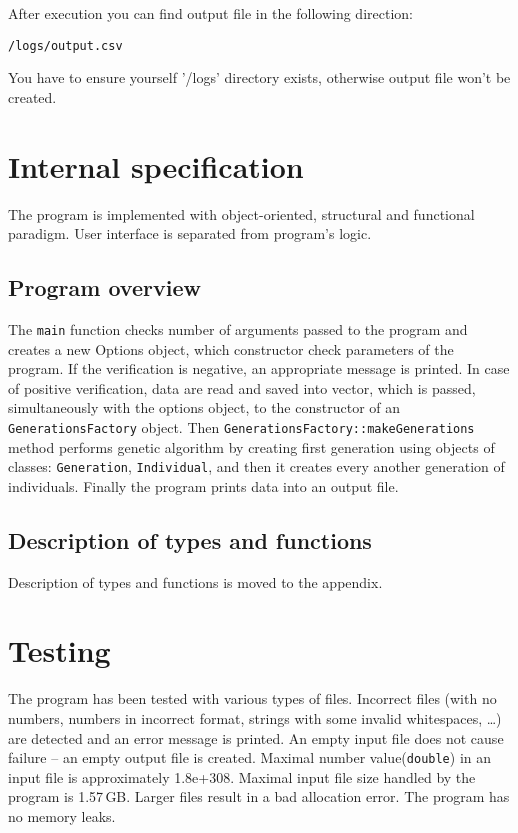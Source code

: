 \documentclass[12pt,a4paper,twoside]{article}
\let\oldmarginpar\marginpar
\renewcommand\marginpar[1]{%
  {\linespread{0.85}\normalfont\scriptsize%
\oldmarginpar[\hspace{1cm}\begin{minipage}{3cm}\raggedleft\scriptsize\color{black}\textsf{#1}\end{minipage}]%
{\hspace{0cm}\begin{minipage}{3cm}\raggedright\scriptsize\color{black}\textsf{#1}\end{minipage}}%
}%
}
\begin{document}
After execution you can find output file in the following direction:
\begin{verbatim}
/logs/output.csv
\end{verbatim}

You have to ensure yourself '/logs' directory exists, otherwise output file won't be created.


\section{Internal specification}\label{sec:internal}
The program is implemented with object-oriented, structural and functional paradigm. User interface is separated from program's logic.

 

\subsection{Program overview}
The \lstinline|main| function checks number of arguments passed to the program and creates a new Options object, which constructor check parameters of the program. If the verification is negative, an appropriate message is printed. In case of positive verification, data are read and saved into vector, which is passed, simultaneously with the options object, to the constructor of an \lstinline|GenerationsFactory| object. Then \lstinline|GenerationsFactory::makeGenerations| method performs genetic algorithm by creating first generation using objects of classes: \lstinline|Generation|, \lstinline|Individual|, and then it creates every another generation of individuals. Finally the program prints data into an output file.

\subsection{Description of types and functions}
Description of types and functions is moved to the appendix.

 

\section{Testing}
The program has been tested with various types of files. Incorrect files (with no numbers, numbers in incorrect format, strings with some invalid whitespaces, \ldots) are detected and an error message is printed. An empty input file does not cause failure – an empty output file is created. Maximal number value(\lstinline!double!) in an input file is approximately 1.8e+308. Maximal input file size handled by the program is \mbox{1.57$\,$GB}. Larger files result in a bad allocation error. The program has no memory leaks.
 
\end{document}
